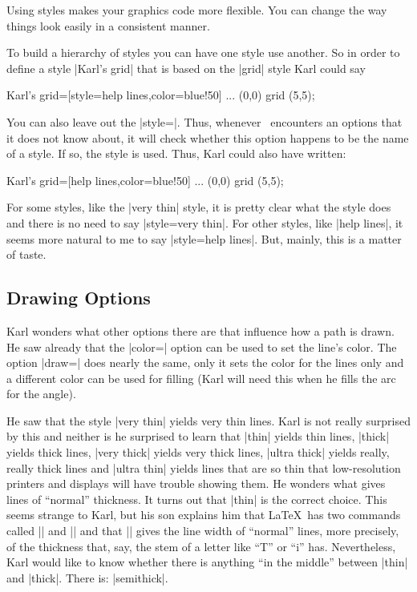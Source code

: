 Using styles makes your graphics code more flexible. You can
change the way things look easily in a consistent manner.

To build a hierarchy of styles you can have one style use
another. So in order to define a style |Karl's grid| that is based on
the |grid| style Karl could say
\begin{codeexample}
\tikzstyle Karl's grid=[style=help lines,color=blue!50]
...
\draw[style=Karl's grid] (0,0) grid (5,5);
\end{codeexample}

You can also leave out the |style=|. Thus, whenever \tikzname\ encounters
an options that it does not know about, it will check whether this
option happens to be the name of a style. If so, the style is
used. Thus, Karl could also have written:
\begin{codeexample}
\tikzstyle Karl's grid=[help lines,color=blue!50]
...
 (0,0) grid (5,5);
\end{codeexample}

For some styles, like the |very thin| style, it is pretty clear what
the style does and there is no need to say |style=very thin|. For
other styles, like |help lines|, it seems more natural to me to say
|style=help lines|. But, mainly, this is a matter of taste.


\subsection{Drawing Options}

Karl wonders what other options there are that influence how a path is
drawn. He saw already that the |color=| option can be used
to set the line's color. The option |draw=| does nearly
the same, only it sets the color for the lines only and a different
color can be used for filling (Karl will need this when he fills the
arc for the angle).

He saw that the style |very thin| yields very thin lines. Karl is not
really surprised by this and neither is he surprised to learn that |thin|
yields thin lines,  |thick| yields thick lines, |very thick| yields
very thick lines, |ultra thick| yields really, really thick lines and
|ultra thin| yields lines that are so thin that low-resolution printers
and displays will have trouble showing them. He wonders what gives
lines of ``normal'' thickness. It turns out that |thin| is the correct
choice. This seems strange to Karl, but his son explains him that
\LaTeX\ has two commands called |\thinlines| and |\thicklines| and
that |\thinlines| gives the line width of ``normal'' lines, more
precisely, of the thickness that, say, the stem of a letter like ``T''
or ``i'' has. Nevertheless, Karl would like to know whether there is
anything ``in the middle'' between |thin| and |thick|. There is:
|semithick|.

